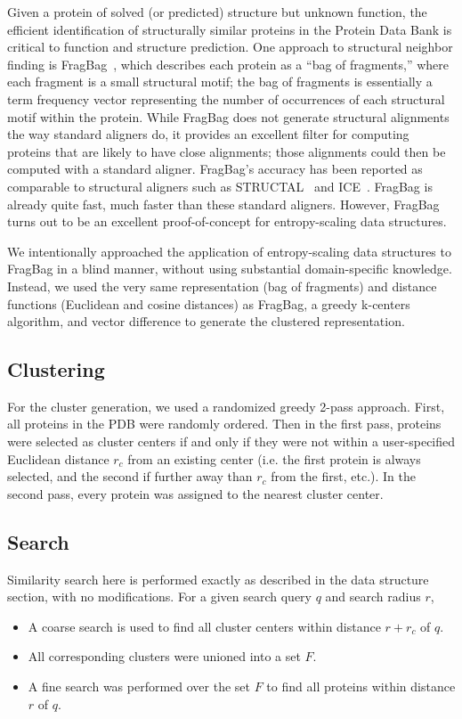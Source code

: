 \documentclass{amsbook}
\theoremstyle{definition}
\theoremstyle{remark}
\numberwithin{equation}{section}
\begin{document}
Given a protein of solved (or predicted) structure but unknown function, the efficient identification
of structurally similar proteins in the Protein Data Bank is critical to function and structure prediction.
One approach to structural neighbor finding is FragBag~\cite{budowski2010fragbag}, which describes each protein as a
``bag of fragments,'' where each fragment is a small structural motif; the bag of fragments is essentially
a term frequency vector representing the number of occurrences of each structural motif within the protein.
While FragBag does not generate structural alignments the way standard aligners do, it provides an excellent
filter for computing proteins that are likely to have close alignments; those alignments could then be computed
with a standard aligner.
FragBag's accuracy has been reported as comparable to structural aligners such as STRUCTAL~\cite{blah} and
ICE~\cite{blah}.
FragBag is already quite fast, much faster than these standard aligners.
However, FragBag turns out to be an excellent proof-of-concept for entropy-scaling data structures.

We intentionally approached the application of entropy-scaling data structures to FragBag in a blind manner,
without using substantial domain-specific knowledge.
Instead, we used the very same representation (bag of fragments) and distance functions (Euclidean and cosine distances)
as FragBag, a greedy k-centers algorithm, and vector difference to generate the clustered representation.

\subsection*{Clustering}
For the cluster generation, we used a randomized greedy 2-pass approach.
First, all proteins in the PDB were randomly ordered.
Then in the first pass, proteins were selected as cluster centers if and only if they were not within a user-specified Euclidean distance $r_c$ from an existing center (i.e. the first protein is always selected, and the second if further away than $r_c$ from the first, etc.).
In the second pass, every protein was assigned to the nearest cluster center.

\subsection*{Search}
Similarity search here is performed exactly as described in the data structure section, with no modifications.
For a given search query $q$ and search radius $r$,
\begin{itemize}
    \item A coarse search is used to find all cluster centers within distance $r+r_c$ of $q$.
    \item All corresponding clusters were unioned into a set $F$.
    \item A fine search was performed over the set $F$ to find all proteins within distance $r$ of $q$.
\end{itemize}
\end{document}
